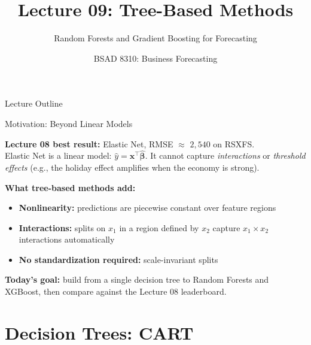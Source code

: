 \documentclass[aspectratio=169, 10pt]{beamer}
\title{Lecture 09: Tree-Based Methods}
\subtitle{Random Forests and Gradient Boosting for Forecasting}
\author{BSAD 8310: Business Forecasting}
\institute{University of Nebraska at Omaha}
\begin{document}

\begin{frame}
  \titlepage
\end{frame}

\begin{frame}{Lecture Outline}
  \tableofcontents
\end{frame}

\begin{frame}{Motivation: Beyond Linear Models}
  \begin{keybox}
    \textbf{Lecture 08 best result:} Elastic Net, RMSE $\approx$ $2{,}540$ on RSXFS.\\[4pt]
    Elastic Net is a linear model: $\hat{y} = \mathbf{x}^\top \hat{\bm{\beta}}$.
    It cannot capture \emph{interactions} or \emph{threshold effects}
    (e.g., the holiday effect amplifies when the economy is strong).
  \end{keybox}

  \medskip
  \textbf{What tree-based methods add:}
  \begin{itemize}
    \item \textbf{Nonlinearity:} predictions are piecewise constant over feature regions
    \item \textbf{Interactions:} splits on $x_1$ in a region defined by $x_2$ capture
          $x_1 \times x_2$ interactions automatically
    \item \textbf{No standardization required:} scale-invariant splits
  \end{itemize}

  \medskip
  \textbf{Today's goal:} build from a single decision tree
  to Random Forests and XGBoost, then compare against the Lecture 08 leaderboard.
\end{frame}

\section{Decision Trees: CART}

\end{document}

